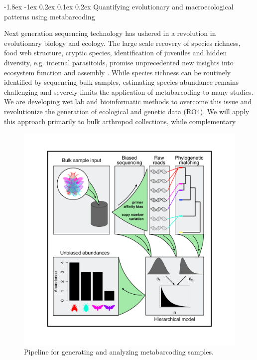 \documentclass[11pt]{article}
\makeatletter
\renewcommand\subsubsection{\@startsection{subsection}{1}{\z@}%
                                  {-1.8ex \@plus -1ex \@minus 0.2ex}%
                                  {0.1ex \@plus 0.2ex}%
                                  {\normalfont\bfseries}}
\makeatother
\begin{document}
\subsubsection{Quantifying evolutionary and macroecological patterns
  using metabarcoding}

Next generation sequencing technology has ushered in a revolution in
evolutionary biology and ecology. The large scale recovery of species
richness, food web structure, cryptic species, identification of
juveniles and hidden diversity, e.g. internal parasitoids, promise
unprecedented new insights into ecosystem function and assembly
\citep{krehenwinkel2016, shokralla2015, gibson2014,
  taberlet2012}. While species richness can be routinely identified by
sequencing bulk samples, estimating species abundance remains
challenging \citep{elbrecht2015} and severely limits the application
of metabarcoding to many studies. We are developing wet lab and
bioinformatic methods to overcome this issue and revolutionize the
generation of ecological and genetic data (RO4). We will apply this
approach primarily to bulk arthropod collections, while complementary
%
\begin{figure}
  \label{fig:metab}
  \vspace{-10pt}
  \begin{center}
    \includegraphics[scale=0.3]{../figs/fig_metab.pdf}
  \end{center}
  \caption{Pipeline for generating and analyzing metabarcoding
    samples.}
  \vspace{0pt}
\end{figure}
\end{document}
